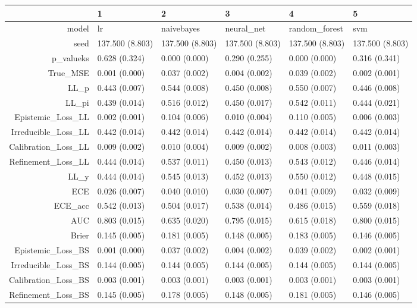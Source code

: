 \begin{table}[ht]
\centering
\begin{tabular}{rlllll}
  \hline
 & 1 & 2 & 3 & 4 & 5 \\ 
  \hline
model & lr & naivebayes & neural\_net & random\_forest & svm \\ 
  seed & 137.500 (8.803) & 137.500 (8.803) & 137.500 (8.803) & 137.500 (8.803) & 137.500 (8.803) \\ 
  p\_valueks & 0.628 (0.324) & 0.000 (0.000) & 0.290 (0.255) & 0.000 (0.000) & 0.316 (0.341) \\ 
  True\_MSE & 0.001 (0.000) & 0.037 (0.002) & 0.004 (0.002) & 0.039 (0.002) & 0.002 (0.001) \\ 
  LL\_p & 0.443 (0.007) & 0.544 (0.008) & 0.450 (0.008) & 0.550 (0.007) & 0.446 (0.008) \\ 
  LL\_pi & 0.439 (0.014) & 0.516 (0.012) & 0.450 (0.017) & 0.542 (0.011) & 0.444 (0.021) \\ 
  Epistemic\_Loss\_LL & 0.002 (0.001) & 0.104 (0.006) & 0.010 (0.004) & 0.110 (0.005) & 0.006 (0.003) \\ 
  Irreducible\_Loss\_LL & 0.442 (0.014) & 0.442 (0.014) & 0.442 (0.014) & 0.442 (0.014) & 0.442 (0.014) \\ 
  Calibration\_Loss\_LL & 0.009 (0.002) & 0.010 (0.004) & 0.009 (0.002) & 0.008 (0.003) & 0.011 (0.003) \\ 
  Refinement\_Loss\_LL & 0.444 (0.014) & 0.537 (0.011) & 0.450 (0.013) & 0.543 (0.012) & 0.446 (0.014) \\ 
  LL\_y & 0.444 (0.014) & 0.545 (0.013) & 0.452 (0.013) & 0.550 (0.012) & 0.448 (0.015) \\ 
  ECE & 0.026 (0.007) & 0.040 (0.010) & 0.030 (0.007) & 0.041 (0.009) & 0.032 (0.009) \\ 
  ECE\_acc & 0.542 (0.013) & 0.504 (0.017) & 0.538 (0.014) & 0.486 (0.015) & 0.559 (0.018) \\ 
  AUC & 0.803 (0.015) & 0.635 (0.020) & 0.795 (0.015) & 0.615 (0.018) & 0.800 (0.015) \\ 
  Brier & 0.145 (0.005) & 0.181 (0.005) & 0.148 (0.005) & 0.183 (0.005) & 0.146 (0.005) \\ 
  Epistemic\_Loss\_BS & 0.001 (0.000) & 0.037 (0.002) & 0.004 (0.002) & 0.039 (0.002) & 0.002 (0.001) \\ 
  Irreducible\_Loss\_BS & 0.144 (0.005) & 0.144 (0.005) & 0.144 (0.005) & 0.144 (0.005) & 0.144 (0.005) \\ 
  Calibration\_Loss\_BS & 0.003 (0.001) & 0.003 (0.001) & 0.003 (0.001) & 0.003 (0.001) & 0.003 (0.001) \\ 
  Refinement\_Loss\_BS & 0.145 (0.005) & 0.178 (0.005) & 0.148 (0.005) & 0.181 (0.005) & 0.146 (0.005) \\ 
   \hline
\end{tabular}
\end{table}
